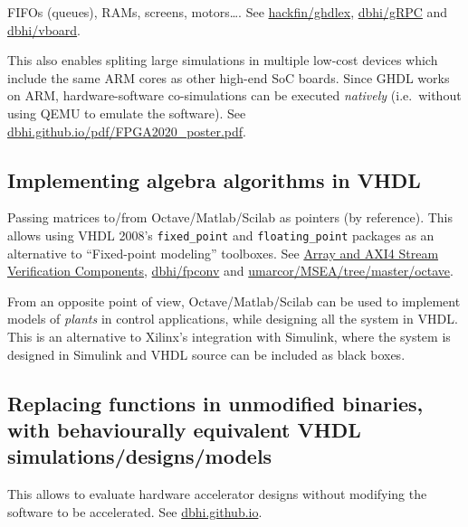 \documentclass[
]{article}
\begin{document}
FIFOs (queues), RAMs, screens, motors\ldots. See \href{https://github.com/hackfin/ghdlex}{hackfin/ghdlex}, \href{https://github.com/dbhi/gRPC}{dbhi/gRPC} and \href{https://github.com/dbhi/vboard}{dbhi/vboard}.

This also enables spliting large simulations in multiple low-cost devices which include the same ARM cores as other high-end SoC boards. Since GHDL works on ARM, hardware-software co-simulations can be executed \emph{natively} (i.e.~without using QEMU to emulate the software). See \href{https://dbhi.github.io/pdf/FPGA2020_poster.pdf}{dbhi.github.io/pdf/FPGA2020\_poster.pdf}.

\hypertarget{implementing-algebra-algorithms-in-vhdl}{%
\subsection{Implementing algebra algorithms in VHDL}\label{implementing-algebra-algorithms-in-vhdl}}

Passing matrices to/from Octave/Matlab/Scilab as pointers (by reference). This allows using VHDL 2008's \texttt{fixed\_point} and \texttt{floating\_point} packages as an alternative to ``Fixed-point modeling'' toolboxes. See \href{https://ghdl.github.io/ghdl-cosim/vhpidirect/examples/arrays.html\#array-and-axi4-stream-verification-components}{Array and AXI4 Stream Verification Components}, \href{https://github.com/dbhi/fpconv}{dbhi/fpconv} and \href{https://github.com/umarcor/MSEA/tree/master/octave}{umarcor/MSEA/tree/master/octave}.

From an opposite point of view, Octave/Matlab/Scilab can be used to implement models of \emph{plants} in control applications, while designing all the system in VHDL. This is an alternative to Xilinx's integration with Simulink, where the system is designed in Simulink and VHDL source can be included as black boxes.

\hypertarget{replacing-functions-in-unmodified-binaries-with-behaviourally-equivalent-vhdl-simulationsdesignsmodels}{%
\subsection{Replacing functions in unmodified binaries, with behaviourally equivalent VHDL simulations/designs/models}\label{replacing-functions-in-unmodified-binaries-with-behaviourally-equivalent-vhdl-simulationsdesignsmodels}}

This allows to evaluate hardware accelerator designs without modifying the software to be accelerated. See \href{https://dbhi.github.io/}{dbhi.github.io}.
\end{document}
